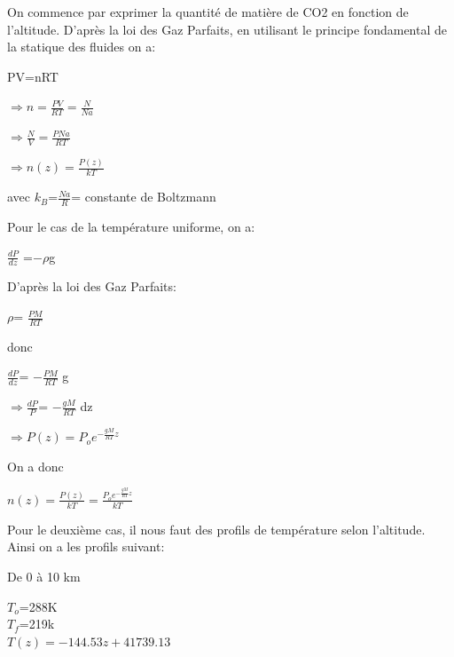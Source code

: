 \documentclass[a4paper, 12pt]{report} %
\begin{document}
On commence par exprimer la quantité de matière de CO2 en fonction de l'altitude.
D'après la loi des Gaz Parfaits, en utilisant le principe fondamental de la statique des fluides on a: 

\begin{center}
    PV=nRT
\end{center}

\begin{center}
    $\Rightarrow n= \frac{PV}{RT}=\frac{N}{Na}$
\end{center}

\begin{center}
    $\Rightarrow\frac{N}{V}= \frac{PNa}{RT}$
\end{center}

\begin{center}
    $\Rightarrow n(z)= \frac{P(z)}{kT} $ 
\end{center}   

avec $k_B$=$\frac{Na}{R}$= constante de Boltzmann \vspace{\baselineskip}

Pour le cas de la température uniforme, on a:

\begin{center}
    $\frac{dP}{dz}$ =$-\rho$g
\end{center}

D'après la loi des Gaz Parfaits: 
\begin{center}
    $\rho$= $\frac{PM}{RT}$
\end{center}

donc 
\begin{center}
    $\frac{dP}{dz}$= $-\frac{PM}{RT}$ g
\end{center}

\begin{center}
    $\Rightarrow\frac{dP}{P}$= $-\frac{gM}{RT}$ dz
\end{center}

\begin{center}
    $\Rightarrow P(z)= P_o e^{-\frac{gM}{RT} z }$
\end{center}

On a donc 
\begin{center}
	$n(z)=\frac{P(z)}{kT}= \frac{ P_o e^{-\frac{gM}{RT} z }}{kT}$
 \end{center}

Pour le deuxième cas, il nous faut des profils de température selon l'altitude.
Ainsi on a les profils suivant:

De 0 à 10 km 
\begin{center}
    $T_o$=288K\\
    $T_f$=219k\\
    $T(z)=-144.53z+41739.13$
\end{center}
\end{document}
